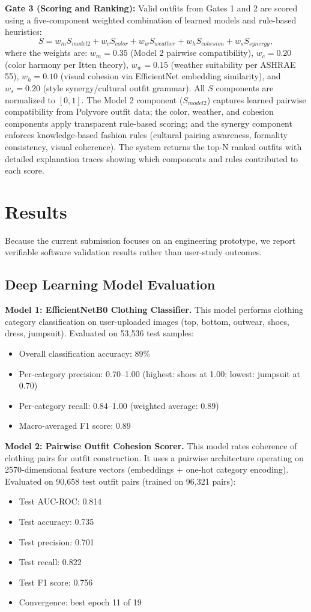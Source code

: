 \documentclass[stu,man]{apa7}
\begin{document}
\textbf{Gate 3 (Scoring and Ranking):} Valid outfits from Gates 1 and 2 are scored using a five-component weighted combination of learned models and rule-based heuristics:
\[
S = w_m S_{model2} + w_c S_{color} + w_w S_{weather} + w_h S_{cohesion} + w_s S_{synergy},
\]
where the weights are: $w_m = 0.35$ (Model 2 pairwise compatibility), $w_c = 0.20$ (color harmony per Itten theory), $w_w = 0.15$ (weather suitability per ASHRAE 55), $w_h = 0.10$ (visual cohesion via EfficientNet embedding similarity), and $w_s = 0.20$ (style synergy/cultural outfit grammar). All $S$ components are normalized to $[0, 1]$. The Model 2 component ($S_{model2}$) captures learned pairwise compatibility from Polyvore outfit data; the color, weather, and cohesion components apply transparent rule-based scoring; and the synergy component enforces knowledge-based fashion rules (cultural pairing awareness, formality consistency, visual coherence). The system returns the top-N ranked outfits with detailed explanation traces showing which components and rules contributed to each score.
\section{Results}
Because the current submission focuses on an engineering prototype, we report verifiable software validation results rather than user-study outcomes.

\subsection{Deep Learning Model Evaluation}

\textbf{Model 1: EfficientNetB0 Clothing Classifier.} This model performs clothing category classification on user-uploaded images (top, bottom, outwear, shoes, dress, jumpsuit). Evaluated on 53,536 test samples:
\begin{itemize}
  \item Overall classification accuracy: 89\%
  \item Per-category precision: 0.70--1.00 (highest: shoes at 1.00; lowest: jumpsuit at 0.70)
  \item Per-category recall: 0.84--1.00 (weighted average: 0.89)
  \item Macro-averaged F1 score: 0.89
\end{itemize}

\textbf{Model 2: Pairwise Outfit Cohesion Scorer.} This model rates coherence of clothing pairs for outfit construction. It uses a pairwise architecture operating on 2570-dimensional feature vectors (embeddings + one-hot category encoding). Evaluated on 90,658 test outfit pairs (trained on 96,321 pairs):
\begin{itemize}
  \item Test AUC-ROC: 0.814
  \item Test accuracy: 0.735
  \item Test precision: 0.701
  \item Test recall: 0.822
  \item Test F1 score: 0.756
  \item Convergence: best epoch 11 of 19
\end{itemize}
\end{document}
